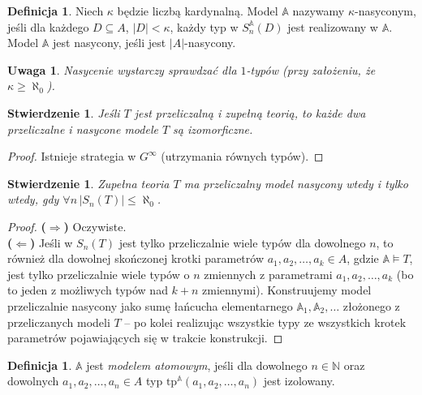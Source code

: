 \documentclass{article}
\newcommand{\N}{\mathbb{N}}
\newcommand{\A}{\mathbb{A}}
\theoremstyle{plain}
\newtheorem{stw}[thm]{Stwierdzenie}
\newtheorem{uw}[thm]{Uwaga}
\theoremstyle{definition}
\newtheorem{df}[thm]{Definicja}
\theoremstyle{remark}
\begin{document}
\begin{df}
	Niech $\kappa$ będzie liczbą kardynalną.
	Model $\A$ nazywamy $\kappa$-nasyconym, jeśli dla każdego $D \subseteq
	A$, $|D| < \kappa$, każdy typ w $S^{\A}_n(D)$ jest realizowany w $\A$.
	Model $\A$ jest nasycony, jeśli jest $|A|$-nasycony.
\end{df}

\begin{uw}
	Nasycenie wystarczy sprawdzać dla $1$-typów
	(przy założeniu, że $\kappa \geq \aleph_0$).
\end{uw}

\begin{stw}
	Jeśli $T$ jest przeliczalną i zupełną teorią, to każde dwa
	przeliczalne i nasycone modele $T$ są izomorficzne.
\end{stw}
\begin{proof}
	Istnieje strategia w $G^\infty$ (utrzymania równych typów).
\end{proof}
\begin{stw}
	Zupełna teoria $T$ ma przeliczalny model nasycony wtedy i tylko wtedy,
	gdy $\forall n \,|S_n(T)| \leq \aleph_0$.
\end{stw}
\begin{proof}
	 \textbf{($\Rightarrow$)} Oczywiste.
	 \\\textbf{($\Leftarrow$)} Jeśli w $S_n(T)$ jest tylko przeliczalnie
	 wiele typów dla dowolnego $n$, to również dla dowolnej skończonej
	 krotki parametrów $a_1, a_2, \ldots, a_k \in A$, gdzie $\A \models T$,
	 jest tylko przeliczalnie wiele typów o $n$ zmiennych z parametrami
	 $a_1, a_2, \ldots, a_k$ (bo to jeden z możliwych typów nad $k+n$
	 zmiennymi). Konstruujemy model przeliczalnie nasycony jako sumę
	 łańcucha elementarnego $\A_1, \A_2, \ldots$ złożonego z przeliczanych
	 modeli $T$ -- po kolei realizując wszystkie typy ze wszystkich krotek
	 parametrów pojawiających się w trakcie konstrukcji.
\end{proof}

\begin{df}
	$\A$ jest \textit{modelem atomowym}, jeśli dla dowolnego $n \in \N$
	oraz dowolnych $a_1, a_2, \ldots, a_n \in A$ typ $\text{tp}^{\A}(a_1,
	a_2, \ldots, a_n)$ jest izolowany.
\end{df}
\end{document}
